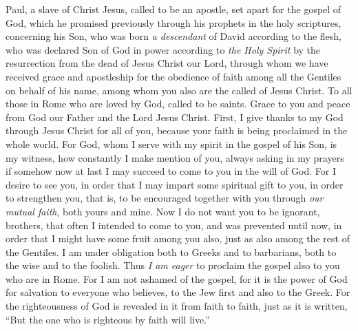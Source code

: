 
\begin{biblechapter} %
 Paul, a slave of Christ Jesus, called to be an apostle, set apart for the gospel of God,
\verse which he promised previously through his prophets in the holy scriptures,
\verse concerning his Son, who was born \textit{a descendant} of David according to the flesh,
\verse who was declared Son of God in power according to \textit{the Holy Spirit} by the resurrection from the dead of Jesus Christ our Lord,
\verse through whom we have received grace and apostleship for the obedience of faith among all the Gentiles on behalf of his name,
\verse among whom you also are the called of Jesus Christ.
\verse To all those in Rome who are loved by God, called to be saints. Grace to you and peace from God our Father and the Lord Jesus Christ.
 First, I give thanks to my God through Jesus Christ for all of you, because your faith is being proclaimed in the whole world.
\verse For God, whom I serve with my spirit in the gospel of his Son, is my witness, how constantly I make mention of you,
\verse always asking in my prayers if somehow now at last I may succeed to come to you in the will of God.
\verse For I desire to see you, in order that I may impart some spiritual gift to you, in order to strengthen you,
\verse that is, to be encouraged together with you through \textit{our mutual faith}, both yours and mine.
\verse Now I do not want you to be ignorant, brothers, that often I intended to come to you, and was prevented until now, in order that I might have some fruit among you also, just as also among the rest of the Gentiles.
\verse I am under obligation both to Greeks and to barbarians, both to the wise and to the foolish.
\verse Thus \textit{I am eager} to proclaim the gospel also to you who are in Rome.
 For I am not ashamed of the gospel, for it is the power of God for salvation to everyone who believes, to the Jew first and also to the Greek.
\verse For the righteousness of God is revealed in it from faith to faith, just as it is written, “But the one who is righteous by faith will live.”

\end{biblechapter}
